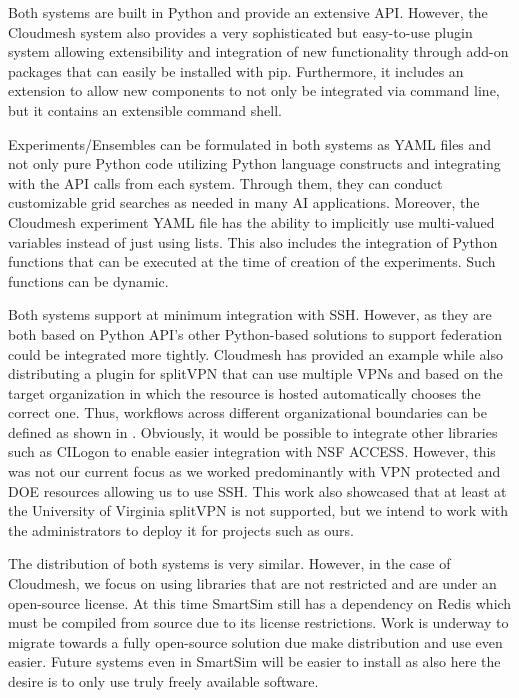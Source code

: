 \documentclass[utf8]{FrontiersinVancouver} %
\begin{document}
Both systems are built in Python and provide an extensive API. However, the Cloudmesh system also provides a very sophisticated but easy-to-use plugin system allowing extensibility and integration of new functionality through add-on packages that can easily be installed with pip. Furthermore, it includes an extension to allow new components to not only be integrated via command line, but it contains an extensible command shell.

Experiments/Ensembles can be formulated in both systems as YAML files and not only pure Python code utilizing Python language constructs and integrating with the API calls from each system. Through them, they can conduct customizable grid searches as needed in many AI applications. Moreover, the Cloudmesh experiment YAML file has the ability to implicitly use multi-valued variables instead of just using lists. This also includes the integration of Python functions that can be executed at the time of creation of the experiments. Such functions can be dynamic.

Both systems support at minimum integration with SSH. However, as they are both based on Python API's other Python-based solutions to support federation could be integrated more tightly. Cloudmesh has provided an example while also distributing a plugin for splitVPN that can use multiple VPNs and based on the target organization in which the resource is hosted automatically chooses the correct one. Thus, workflows  
across different organizational boundaries can be defined as shown in \citep{las-frontiers-edu}. Obviously, it would be possible to integrate other libraries such as
CILogon to enable easier integration with NSF ACCESS. However, this was not our current focus as we worked predominantly with VPN protected and DOE resources allowing us to use SSH. This work also showcased that at least at the University of Virginia splitVPN is not supported, but we intend to work with the administrators to deploy it for projects such as ours.

The distribution of both systems is very similar. However, in the case of Cloudmesh, we focus on using libraries that are not restricted and are under an open-source license. At this time SmartSim still has a dependency on Redis which must be compiled from source due to its license restrictions. Work is underway to migrate towards a fully open-source solution due make distribution and use even easier. Future systems even in SmartSim will be easier to install as also here the desire is to only use truly freely available software.
\end{document}
